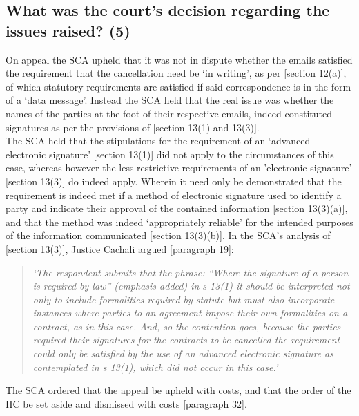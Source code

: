 \documentclass[11pt]{article}
\begin{document}
\subsection{What was the court's decision regarding the issues raised? (5)}
\label{sec:org476c79e}

On appeal the SCA upheld that it was not in dispute whether the emails satisfied
the requirement that the cancellation need be `in writing', as per [section
12(a)]\cite{rsa02_elect_comm_trans_act}, of which statutory requirements are
satisfied if said correspondence is in the form of a `data message'. Instead the
SCA held that the real issue was whether the names of the parties at the foot of
their respective emails, indeed constituted signatures as per the provisions of
[section 13(1) and 13(3)]\cite{rsa02_elect_comm_trans_act}.\\

The SCA held that the stipulations for the requirement of an `advanced
electronic signature' [section 13(1)]\cite{rsa02_elect_comm_trans_act} did not
apply to the circumstances of this case, whereas however the less restrictive
requirements of an 'electronic signature' [section
13(3)]\cite{rsa02_elect_comm_trans_act} do indeed apply. Wherein it need only be
demonstrated that the requirement is indeed met if a method of electronic
signature used to identify a party and indicate their approval of the contained
information [section 13(3)(a)]\cite{rsa02_elect_comm_trans_act}, and that the method
was indeed `appropriately reliable' for the intended purposes of the information
communicated [section 13(3)(b)]\cite{rsa02_elect_comm_trans_act}. In the SCA's analysis of [section 13(3)]\cite{rsa02_elect_comm_trans_act}, Justice
Cachali argued [paragraph 19]\cite{Cachalia15_spring_forest_v_wilberry}:
\begin{quote}
\textit{‘The respondent submits that the phrase: “Where the signature of a person is required by law” (emphasis added) in s 13(1) it should be interpreted not only to include formalities required by statute but must also incorporate instances where parties to an agreement impose their own formalities on a contract, as in this case. And, so the contention goes, because the parties required their signatures for the contracts to be cancelled the requirement could only be satisfied by the use of an advanced electronic signature as contemplated in s 13(1), which did not occur in this case.’}
\end{quote}

The SCA ordered that the appeal be upheld with costs, and that the order of the
HC be set aside and dismissed with costs [paragraph 32]\cite{Cachalia15_spring_forest_v_wilberry}.
\end{document}
